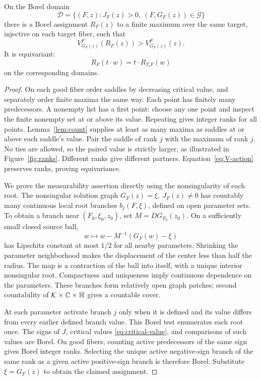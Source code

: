 \begin{proposition}\label{prop:pair}
On the Borel domain
\[
 \mathcal D=\{(F,z):J_F(z)>0,\ (F,G_F(z))\in\mathcal G\}
\]
there is a Borel assignment \(R_F(z)\) to a finite maximum over
the same target, injective on each target fiber, such that
\begin{equation}\label{eq:strict-value}
 V_{G_F(z)}^F(R_F(z))>V_{G_F(z)}^F(z).
\end{equation}
It is equivariant:
\[
 R_F(t\cdot w)=t\cdot R_{T_tF}(w)
\]
on the corresponding domains.
\end{proposition}
\begin{proof}
On each good fiber order saddles by decreasing critical value,
and separately order finite maxima the same way.
Each point has finitely many predecessors. A nonempty list has a
first point: choose any one point and inspect the finite nonempty
set at or above its value. Repeating gives integer ranks for all points.
Lemma~\ref{lem:count} supplies at least as many maxima as saddles
at or above each saddle's value. Pair the saddle of rank \(j\)
with the maximum of rank \(j\).
No ties are allowed, so the paired value is strictly larger,
as illustrated in Figure~\ref{fig:ranks}.
Different ranks give different partners. Equation~\eqref{eq:V-action}
preserves ranks, proving equivariance.

We prove the measurability assertion directly using the nonsingularity
of each root.
The nonsingular solution graph \(G_F(z)=\xi,\ J_F(z)\ne0\)
has countably many continuous local root branches \(b_j(F,\xi)\),
defined on open parameter sets.
To obtain a branch near \((F_0,\xi_0,z_0)\), set
\(M=DG_{F_0}(z_0)\). On a sufficiently small closed source ball,
\[
 w\longmapsto w-M^{-1}(G_F(w)-\xi)
\]
has Lipschitz constant at most \(1/2\) for all nearby parameters.
Shrinking the parameter neighborhood makes the displacement of
the center less than half the radius. The map is a contraction
of the ball into itself, with a unique interior nonsingular root.
Compactness and uniqueness imply continuous dependence on the
parameters. These branches form relatively open graph patches;
second countability of \(\mathcal K\times\mathbb C\times\mathbb H\) gives a countable cover.

At each parameter activate branch \(j\) only when it is defined
and its value differs from every earlier defined branch value.
This Borel test enumerates each root once.
The signs of \(J\), critical values \eqref{eq:critical-value},
and comparisons of such values are Borel. On good fibers,
counting active predecessors of the same sign gives Borel integer
ranks. Selecting the unique active negative-sign branch of the
same rank as a given active positive-sign branch is therefore Borel.
Substitute \(\xi=G_F(z)\) to obtain the claimed assignment.
\end{proof}


